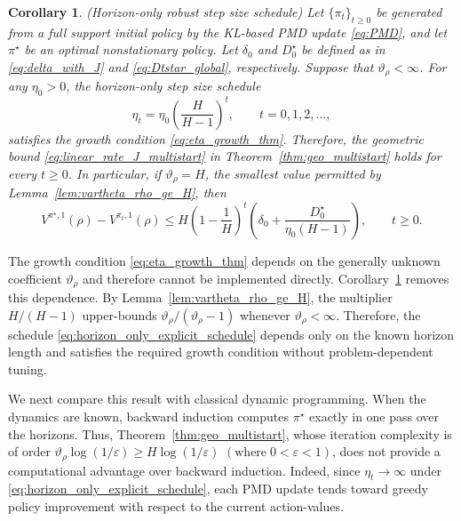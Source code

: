 \documentclass[11pt]{article}
\newcommand{\eps}{\varepsilon}
\renewcommand{\epsilon}{\eps}
\newtheorem{cor}{Corollary}
\begin{document}
\begin{cor}(Horizon-only robust step size schedule)
\label{cor:horizon_only_stepsize}
Let $\{\pi_t\}_{t\ge0}$ be generated from a full support initial policy by the
KL-based PMD update \eqref{eq:PMD}, and let $\pi^\star$ be an optimal
nonstationary policy. Let $\delta_0$ and $D_0^\star$ be defined as in
\eqref{eq:delta_with_J} and \eqref{eq:Dtstar_global}, respectively. Suppose
that $\vartheta_\rho<\infty$. For any $\eta_0>0$, the horizon-only step size
schedule
\begin{equation}
\label{eq:horizon_only_explicit_schedule}
\eta_t
=
\eta_0\left(\frac{H}{H-1}\right)^t,
\qquad t=0,1,2,\ldots,
\end{equation}
satisfies the growth condition \eqref{eq:eta_growth_thm}. Therefore, the
geometric bound \eqref{eq:linear_rate_J_multistart} in
Theorem~\ref{thm:geo_multistart} holds for every $t\ge0$. In particular, if
$\vartheta_\rho=H$, the smallest value permitted by
Lemma~\ref{lem:vartheta_rho_ge_H}, then
\begin{equation}
\label{eq:horizon_only_best_case_bound}
V^{\pi^\star,1}(\rho)-V^{\pi_t,1}(\rho)
\le
H\left(1-\frac{1}{H}\right)^t
\left(
\delta_0+
\frac{D_0^\star}{\eta_0(H-1)}
\right),
\qquad t\ge0.
\end{equation}
\end{cor}

The growth condition \eqref{eq:eta_growth_thm} depends on the generally
unknown coefficient $\vartheta_\rho$ and therefore cannot be implemented
directly. Corollary~\ref{cor:horizon_only_stepsize} removes this dependence.
By Lemma~\ref{lem:vartheta_rho_ge_H}, the multiplier $H/(H-1)$ upper-bounds
$\vartheta_\rho/(\vartheta_\rho-1)$ whenever $\vartheta_\rho<\infty$.
Therefore, the schedule \eqref{eq:horizon_only_explicit_schedule} depends only
on the known horizon length and satisfies the required growth condition
without problem-dependent tuning.

We next compare this result with classical dynamic programming. When the
dynamics are known, backward induction computes $\pi^\star$ exactly in one
pass over the horizons. Thus, Theorem~\ref{thm:geo_multistart}, whose
iteration complexity is of order
$\vartheta_\rho\log(1/\varepsilon)\ge H\log(1/\varepsilon)$ $(\text{where}\; 0<\epsilon<1)$, does not provide
a computational advantage over backward induction. Indeed, since
$\eta_t\to\infty$ under \eqref{eq:horizon_only_explicit_schedule}, each PMD
update tends toward greedy policy improvement with respect to the current
action-values.
\end{document}
